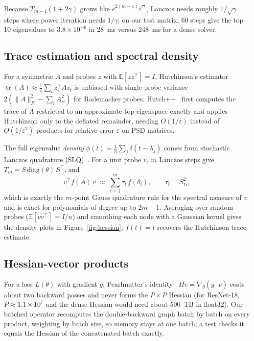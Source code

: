 \documentclass[11pt]{article}
\theoremstyle{definition}
\newcommand{\E}{\mathbb{E}}
\newcommand{\tr}{\operatorname{tr}}
\begin{document}
Because $T_{m-1}(1+2\gamma)$ grows like $e^{2(m-1)\sqrt{\gamma}}$, Lanczos needs roughly
$1/\sqrt{\gamma}$ steps where power iteration needs $1/\gamma$; on our test matrix, 60 steps give the
top 10 eigenvalues to $3.8\times10^{-6}$ in 28~ms versus 248~ms for a dense solver.

\subsection{Trace estimation and spectral density}

For a symmetric $A$ and probes $z$ with $\E[zz^\top] = I$, Hutchinson's estimator~\cite{hutchinson1989}
$\tr(A) \approx \frac1s\sum_i z_i^\top A z_i$ is unbiased with single-probe variance
$2(\|A\|_F^2 - \sum_i A_{ii}^2)$ for Rademacher probes. Hutch++~\cite{meyer2021} first computes the
trace of $A$ restricted to an approximate top eigenspace exactly and applies Hutchinson only to
the deflated remainder, needing $O(1/\varepsilon)$ instead of $O(1/\varepsilon^2)$ products for
relative error $\varepsilon$ on PSD matrices.

The full eigenvalue \emph{density} $\phi(t) = \frac1n\sum_j \delta(t-\lambda_j)$ comes from
stochastic Lanczos quadrature (SLQ)~\cite{lin2016,ghorbani2019}. For a unit probe $v$, $m$
Lanczos steps give $T_m = S\,\mathrm{diag}(\theta)\,S^\top$, and
\[
v^\top f(A)\, v \;\approx\; \sum_{i=1}^m \tau_i\, f(\theta_i), \qquad \tau_i = S_{1i}^2,
\]
which is exactly the $m$-point Gauss quadrature rule for the spectral measure of $v$ and is
exact for polynomials of degree up to $2m-1$. Averaging over random probes
($\E[vv^\top] = I/n$) and smoothing each node with a Gaussian kernel gives the density plots
in Figure~\ref{fig:hessian}; $f(t)=t$ recovers the Hutchinson trace estimate.

\subsection{Hessian-vector products}

For a loss $L(\theta)$ with gradient $g$, Pearlmutter's identity~\cite{pearlmutter1994} $Hv = \nabla_\theta(g^\top v)$ costs
about two backward passes and never forms the $P \times P$ Hessian (for ResNet-18, $P \approx 1.1
\times 10^7$ and the dense Hessian would need about 500~TB in float32). Our batched operator
recomputes the double-backward graph batch by batch on every product, weighting by batch size, so
memory stays at one batch; a test checks it equals the Hessian of the concatenated batch exactly.
\end{document}
